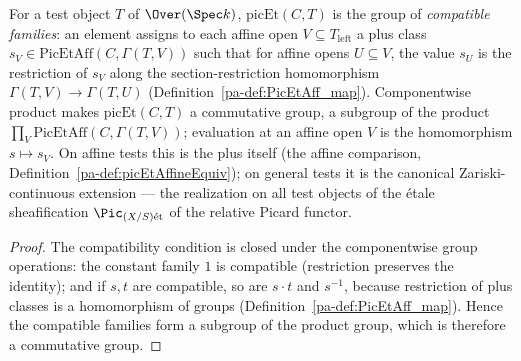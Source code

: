 \begin{definition}
  \label{pa-def:picEt}
  \leanok

  For a test object \(T\) of \(\Over(\Spec k)\), \(\mathrm{picEt}(C, T)\) is the group of
  \emph{compatible families}: an element assigns to each affine open \(V \subseteq T_{\mathrm{left}}\)
  a plus class \(s_V \in \mathrm{PicEtAff}(C, \Gamma(T, V))\) such that for affine opens
  \(U \subseteq V\), the value \(s_U\) is the restriction of \(s_V\) along the section-restriction
  homomorphism \(\Gamma(T, V) \to \Gamma(T, U)\) (Definition~\ref{pa-def:PicEtAff_map}). Componentwise
  product makes \(\mathrm{picEt}(C, T)\) a commutative group, a subgroup of the product
  \(\prod_{V} \mathrm{PicEtAff}(C, \Gamma(T, V))\); evaluation at an affine open \(V\) is the
  homomorphism \(s \mapsto s_V\). On affine tests this is the plus itself (the affine comparison,
  Definition~\ref{pa-def:picEtAffineEquiv}); on general tests it is the canonical Zariski-continuous
  extension --- the realization on all test objects of the \'etale sheafification
  \(\Pic_{(X/S)\mathrm{\acute et}}\) of the relative Picard functor.
\end{definition}
\begin{proof}
  \leanok
  The compatibility condition is closed under the componentwise group operations: the constant
  family \(1\) is compatible (restriction preserves the identity); and if \(s, t\) are compatible,
  so are \(s \cdot t\) and \(s^{-1}\), because restriction of plus classes is a homomorphism of
  groups (Definition~\ref{pa-def:PicEtAff_map}). Hence the compatible families form a subgroup of the
  product group, which is therefore a commutative group.
\end{proof}

